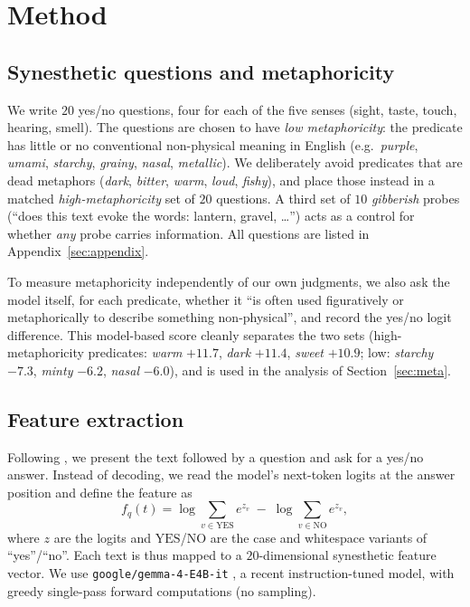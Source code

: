 \documentclass[11pt]{article}
\begin{document}
\section{Method}
\subsection{Synesthetic questions and metaphoricity}
We write $20$ yes/no questions, four for each of the five senses (sight, taste, touch, hearing, smell). The questions are chosen to have \emph{low metaphoricity}: the predicate has little or no conventional non-physical meaning in English (e.g.\ \emph{purple}, \emph{umami}, \emph{starchy}, \emph{grainy}, \emph{nasal}, \emph{metallic}). We deliberately avoid predicates that are dead metaphors (\emph{dark}, \emph{bitter}, \emph{warm}, \emph{loud}, \emph{fishy}), and place those instead in a matched \emph{high-metaphoricity} set of $20$ questions. A third set of $10$ \emph{gibberish} probes (``does this text evoke the words: lantern, gravel, \dots'') acts as a control for whether \emph{any} probe carries information. All questions are listed in Appendix~\ref{sec:appendix}.

To measure metaphoricity independently of our own judgments, we also ask the model itself, for each predicate, whether it ``is often used figuratively or metaphorically to describe something non-physical'', and record the yes/no logit difference. This model-based score cleanly separates the two sets (high-metaphoricity predicates: \emph{warm} $+11.7$, \emph{dark} $+11.4$, \emph{sweet} $+10.9$; low: \emph{starchy} $-7.3$, \emph{minty} $-6.2$, \emph{nasal} $-6.0$), and is used in the analysis of Section~\ref{sec:meta}.

\subsection{Feature extraction}
Following \citet{florescuAlgorithmicallyGeneratingNew2019}, we present the text followed by a question and ask for a yes/no answer. Instead of decoding, we read the model's next-token logits at the answer position and define the feature as
\[
f_q(t) = \log\!\!\sum_{v\in\mathrm{YES}}\!\! e^{z_v} \;-\; \log\!\!\sum_{v\in\mathrm{NO}}\!\! e^{z_v},
\]
where $z$ are the logits and $\mathrm{YES}$/$\mathrm{NO}$ are the case and whitespace variants of ``yes''/``no''. Each text is thus mapped to a $20$-dimensional synesthetic feature vector. We use \texttt{google/gemma-4-E4B-it} \citep{gemma4_2026}, a recent instruction-tuned model, with greedy single-pass forward computations (no sampling).
\end{document}
